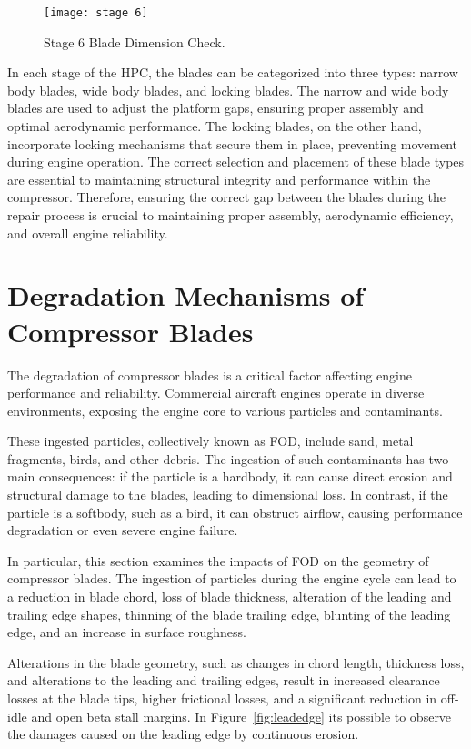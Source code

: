 \begin{figure}[H]
    \centering
    \texttt{[image: stage 6]}
    \caption{Stage 6 Blade Dimension Check.\cite{ESM}}
    \label{fig:stage6}
\end{figure}

In each stage of the HPC, the blades can be categorized into three types: narrow body blades, wide body blades, and locking blades. The narrow and wide body blades are used to adjust the platform gaps, ensuring proper assembly and optimal aerodynamic performance. The locking blades, on the other hand, incorporate locking mechanisms that secure them in place, preventing movement during engine operation. The correct selection and placement of these blade types are essential to maintaining structural integrity and performance within the compressor.
Therefore, ensuring the correct gap between the blades during the repair process is crucial to maintaining proper assembly, aerodynamic efficiency, and overall engine reliability.

\section{Degradation Mechanisms of Compressor Blades}
\label{sec:degradation}

The degradation of compressor blades is a critical factor affecting engine performance and reliability. Commercial aircraft engines operate in diverse environments, exposing the engine core to various particles and contaminants.

These ingested particles, collectively known as \gls{FOD}, include sand, metal fragments, birds, and other debris. The ingestion of such contaminants has two main consequences: if the particle is a hardbody, it can cause direct erosion and structural damage to the blades, leading to dimensional loss. In contrast, if the particle is a softbody, such as a bird, it can obstruct airflow, causing performance degradation or even severe engine failure.

In particular, this section examines the impacts of \gls{FOD} on the geometry of compressor blades. The ingestion of particles during the engine cycle can lead to a reduction in blade chord, loss of blade thickness, alteration of the leading and trailing edge shapes, thinning of the blade trailing edge, blunting of the leading edge, and an increase in surface roughness.

Alterations in the blade geometry, such as changes in chord length, thickness loss, and alterations to the leading and trailing edges, result in increased clearance losses at the blade tips, higher frictional losses, and a significant reduction in off-idle and open beta stall margins. In Figure~\ref{fig:leadedge} its possible to observe the damages caused on the leading edge by continuous erosion. \cite{Shi2023}

